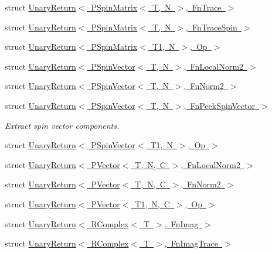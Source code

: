 \begin{DoxyCompactItemize}
struct \mbox{\hyperlink{structENSEM_1_1UnaryReturn_3_01PSpinMatrix_3_01T_00_01N_01_4_00_01FnTrace_01_4}{Unary\+Return$<$ P\+Spin\+Matrix$<$ T, N $>$, Fn\+Trace $>$}}
\item 
struct \mbox{\hyperlink{structENSEM_1_1UnaryReturn_3_01PSpinMatrix_3_01T_00_01N_01_4_00_01FnTraceSpin_01_4}{Unary\+Return$<$ P\+Spin\+Matrix$<$ T, N $>$, Fn\+Trace\+Spin $>$}}
\item 
struct \mbox{\hyperlink{structENSEM_1_1UnaryReturn_3_01PSpinMatrix_3_01T1_00_01N_01_4_00_01Op_01_4}{Unary\+Return$<$ P\+Spin\+Matrix$<$ T1, N $>$, Op $>$}}
\item 
struct \mbox{\hyperlink{structENSEM_1_1UnaryReturn_3_01PSpinVector_3_01T_00_01N_01_4_00_01FnLocalNorm2_01_4}{Unary\+Return$<$ P\+Spin\+Vector$<$ T, N $>$, Fn\+Local\+Norm2 $>$}}
\item 
struct \mbox{\hyperlink{structENSEM_1_1UnaryReturn_3_01PSpinVector_3_01T_00_01N_01_4_00_01FnNorm2_01_4}{Unary\+Return$<$ P\+Spin\+Vector$<$ T, N $>$, Fn\+Norm2 $>$}}
\item 
struct \mbox{\hyperlink{structENSEM_1_1UnaryReturn_3_01PSpinVector_3_01T_00_01N_01_4_00_01FnPeekSpinVector_01_4}{Unary\+Return$<$ P\+Spin\+Vector$<$ T, N $>$, Fn\+Peek\+Spin\+Vector $>$}}
\begin{DoxyCompactList}\small\item\em Extract spin vector components. \end{DoxyCompactList}\item 
struct \mbox{\hyperlink{structENSEM_1_1UnaryReturn_3_01PSpinVector_3_01T1_00_01N_01_4_00_01Op_01_4}{Unary\+Return$<$ P\+Spin\+Vector$<$ T1, N $>$, Op $>$}}
\item 
struct \mbox{\hyperlink{structENSEM_1_1UnaryReturn_3_01PVector_3_01T_00_01N_00_01C_01_4_00_01FnLocalNorm2_01_4}{Unary\+Return$<$ P\+Vector$<$ T, N, C $>$, Fn\+Local\+Norm2 $>$}}
\item 
struct \mbox{\hyperlink{structENSEM_1_1UnaryReturn_3_01PVector_3_01T_00_01N_00_01C_01_4_00_01FnNorm2_01_4}{Unary\+Return$<$ P\+Vector$<$ T, N, C $>$, Fn\+Norm2 $>$}}
\item 
struct \mbox{\hyperlink{structENSEM_1_1UnaryReturn_3_01PVector_3_01T1_00_01N_00_01C_01_4_00_01Op_01_4}{Unary\+Return$<$ P\+Vector$<$ T1, N, C $>$, Op $>$}}
\item 
struct \mbox{\hyperlink{structENSEM_1_1UnaryReturn_3_01RComplex_3_01T_01_4_00_01FnImag_01_4}{Unary\+Return$<$ R\+Complex$<$ T $>$, Fn\+Imag $>$}}
\item 
struct \mbox{\hyperlink{structENSEM_1_1UnaryReturn_3_01RComplex_3_01T_01_4_00_01FnImagTrace_01_4}{Unary\+Return$<$ R\+Complex$<$ T $>$, Fn\+Imag\+Trace $>$}}

\end{DoxyCompactItemize}
